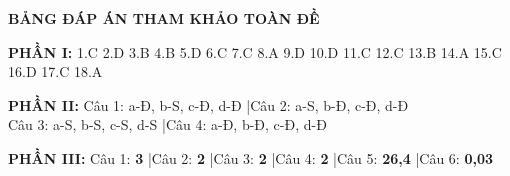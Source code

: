 \documentclass[11pt,a4paper]{article}
\begin{document}
\vspace{0.3cm}
\noindent
\textbf{\color{hfRed}\large BẢNG ĐÁP ÁN THAM KHẢO TOÀN ĐỀ}

\vspace{0.1cm}
\noindent
\textbf{\color{mainGreen}PHẦN I:} 1.C \quad 2.D \quad 3.B \quad 4.B \quad 5.D \quad 6.C \quad 7.C \quad 8.A \quad 9.D \quad 10.D \quad 11.C \quad 12.C \quad 13.B \quad 14.A \quad 15.C \quad 16.D \quad 17.C \quad 18.A

\vspace{0.1cm}
\noindent
\textbf{\color{mainGreen}PHẦN II:} Câu 1: a-Đ, b-S, c-Đ, d-Đ \quad|\quad Câu 2: a-S, b-Đ, c-Đ, d-Đ\\
Câu 3: a-S, b-S, c-S, d-S \quad|\quad Câu 4: a-Đ, b-Đ, c-Đ, d-Đ

\vspace{0.1cm}
\noindent
\textbf{\color{mainGreen}PHẦN III:} Câu 1: \textbf{3} \quad|\quad Câu 2: \textbf{2} \quad|\quad Câu 3: \textbf{2} \quad|\quad Câu 4: \textbf{2} \quad|\quad Câu 5: \textbf{26,4} \quad|\quad Câu 6: \textbf{0,03}

\end{document}
